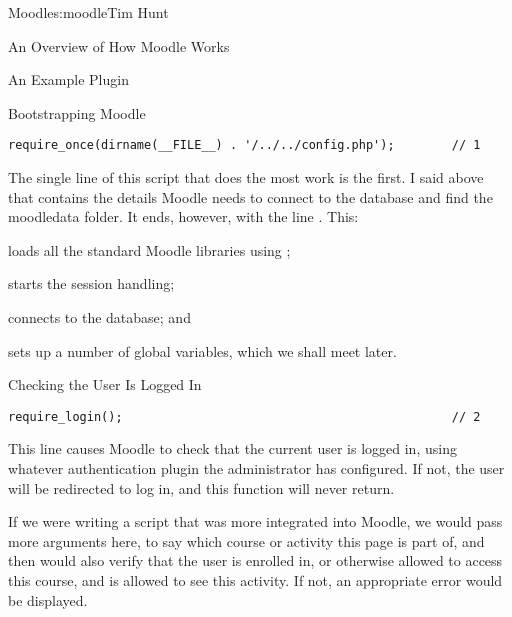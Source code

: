 \begin{aosachapter}{Moodle}{s:moodle}{Tim Hunt}
\begin{aosasect1}{An Overview of How Moodle Works}
\begin{aosasect2}{An Example Plugin}
\end{aosasect2}

\begin{aosasect2}{Bootstrapping Moodle}

\begin{verbatim}
require_once(dirname(__FILE__) . '/../../config.php');        // 1
\end{verbatim}

The single line of this script that does the most work is the first. I
said above that  contains the details Moodle needs to
connect to the database and find the moodledata folder. It ends,
however, with the line . This:

\begin{aosaenumerate}

\item loads all the standard Moodle libraries using
  ;

\item starts the session handling;

\item connects to the database; and

\item sets up a number of global variables, which we shall meet later.

\end{aosaenumerate}

\end{aosasect2}

\begin{aosasect2}{Checking the User Is Logged In}

\begin{verbatim}
require_login();                                              // 2
\end{verbatim}

This line causes Moodle to check that the current user is logged in,
using whatever authentication plugin the administrator has
configured. If not, the user will be redirected to log in, and this
function will never return.

If we were writing a script that was more integrated into Moodle, we
would pass more arguments here, to say which course or activity this
page is part of, and then  would also verify that
the user is enrolled in, or otherwise allowed to access this course,
and is allowed to see this activity. If not, an appropriate error
would be displayed.


\end{aosasect2}
\end{aosasect1}
\end{aosachapter}
